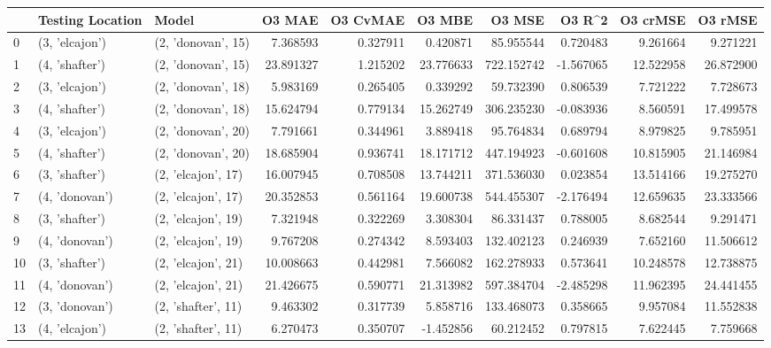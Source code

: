 \begin{tabular}{lllrrrrrrr}
\toprule
{} & Testing Location &               Model &     O3 MAE &  O3 CvMAE &     O3 MBE &       O3 MSE &    O3 R\textasciicircum2 &   O3 crMSE &    O3 rMSE \\
\midrule
0  &   (3, 'elcajon') &  (2, 'donovan', 15) &   7.368593 &  0.327911 &   0.420871 &    85.955544 &  0.720483 &   9.261664 &   9.271221 \\
1  &   (4, 'shafter') &  (2, 'donovan', 15) &  23.891327 &  1.215202 &  23.776633 &   722.152742 & -1.567065 &  12.522958 &  26.872900 \\
2  &   (3, 'elcajon') &  (2, 'donovan', 18) &   5.983169 &  0.265405 &   0.339292 &    59.732390 &  0.806539 &   7.721222 &   7.728673 \\
3  &   (4, 'shafter') &  (2, 'donovan', 18) &  15.624794 &  0.779134 &  15.262749 &   306.235230 & -0.083936 &   8.560591 &  17.499578 \\
4  &   (3, 'elcajon') &  (2, 'donovan', 20) &   7.791661 &  0.344961 &   3.889418 &    95.764834 &  0.689794 &   8.979825 &   9.785951 \\
5  &   (4, 'shafter') &  (2, 'donovan', 20) &  18.685904 &  0.936741 &  18.171712 &   447.194923 & -0.601608 &  10.815905 &  21.146984 \\
6  &   (3, 'shafter') &  (2, 'elcajon', 17) &  16.007945 &  0.708508 &  13.744211 &   371.536030 &  0.023854 &  13.514166 &  19.275270 \\
7  &   (4, 'donovan') &  (2, 'elcajon', 17) &  20.352853 &  0.561164 &  19.600738 &   544.455307 & -2.176494 &  12.659635 &  23.333566 \\
8  &   (3, 'shafter') &  (2, 'elcajon', 19) &   7.321948 &  0.322269 &   3.308304 &    86.331437 &  0.788005 &   8.682544 &   9.291471 \\
9  &   (4, 'donovan') &  (2, 'elcajon', 19) &   9.767208 &  0.274342 &   8.593403 &   132.402123 &  0.246939 &   7.652160 &  11.506612 \\
10 &   (3, 'shafter') &  (2, 'elcajon', 21) &  10.008663 &  0.442981 &   7.566082 &   162.278933 &  0.573641 &  10.248578 &  12.738875 \\
11 &   (4, 'donovan') &  (2, 'elcajon', 21) &  21.426675 &  0.590771 &  21.313982 &   597.384704 & -2.485298 &  11.962395 &  24.441455 \\
12 &   (3, 'donovan') &  (2, 'shafter', 11) &   9.463302 &  0.317739 &   5.858716 &   133.468073 &  0.358665 &   9.957084 &  11.552838 \\
13 &   (4, 'elcajon') &  (2, 'shafter', 11) &   6.270473 &  0.350707 &  -1.452856 &    60.212452 &  0.797815 &   7.622445 &   7.759668 \\

\end{tabular}
